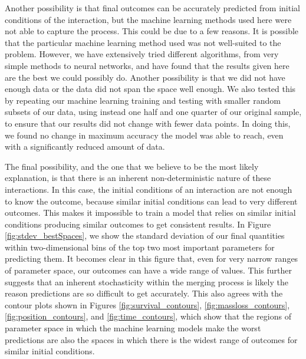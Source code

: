 \documentclass[fleqn,usenatbib]{mnras}
\begin{document}
Another possibility is that final outcomes can be accurately predicted from initial conditions of the interaction, but the machine learning methods used here were not able to capture the process. This could be due to a few reasons. It is possible that the particular machine learning method used was not well-suited to the problem. However, we have extensively tried different algorithms, from very simple methods to neural networks, and have found that the results given here are the best we could possibly do. Another possibility is that we did not have enough data or the data did not span the space well enough. We also tested this by repeating our machine learning training and testing with smaller random subsets of our data, using instead one half and one quarter of our original sample, to ensure that our results did not change with fewer data points. In doing this, we found no change in maximum accuracy the model was able to reach, even with a significantly reduced amount of data.

The final possibility, and the one that we believe to be the most likely explanation, is that there is an inherent non-deterministic nature of these interactions. In this case, the initial conditions of an interaction are not enough to know the outcome, because similar initial conditions can lead to very different outcomes. This makes it impossible to train a model that relies on similar initial conditions producing similar outcomes to get consistent results. In Figure \ref{fig:stdev_bestSpaces}, we show the standard deviation of our final quantities within two-dimensional bins of the top two most important parameters for predicting them. It becomes clear in this figure that, even for very narrow ranges of parameter space, our outcomes can have a wide range of values. This further suggests that an inherent stochasticity within the merging process is likely the reason predictions are so difficult to get accurately. This also agrees with the contour plots shown in Figures \ref{fig:survival_contours}, \ref{fig:massloss_contours}, \ref{fig:position_contours}, and \ref{fig:time_contours}, which show that the regions of parameter space in which the machine learning models make the worst predictions are also the spaces in which there is the widest range of outcomes for similar initial conditions.
\end{document}
